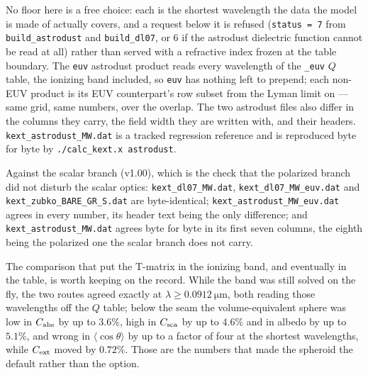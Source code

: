 \documentclass{my_memo}
\begin{document}
\medskip
\noindent No floor here is a free choice: each is the shortest
wavelength the data the model is made of actually covers, and a request
below it is refused (\texttt{status = 7} from \texttt{build\_astrodust}
and \texttt{build\_dl07}, or $6$ if the astrodust dielectric function
cannot be read at all) rather than served with a refractive index
frozen at the table boundary. The \texttt{euv} astrodust product reads
every wavelength of the \texttt{\_euv} $Q$ table, the ionizing band
included, so \texttt{euv} has nothing left to prepend; each non-EUV
product is its EUV counterpart's row subset from the Lyman limit on ---
same grid, same numbers, over the overlap. The two astrodust files also
differ in the columns they carry, the field width they are written
with, and their headers.
\texttt{kext\_astrodust\_MW.dat} is a tracked regression reference and
is reproduced byte for byte by \texttt{./calc\_kext.x astrodust}.

\medskip
\noindent Against the scalar branch (v1.00), which is the check that the
polarized branch did not disturb the scalar optics:
\texttt{kext\_dl07\_MW.dat}, \texttt{kext\_dl07\_MW\_euv.dat} and
\texttt{kext\_zubko\_BARE\_GR\_S.dat} are byte-identical;
\texttt{kext\_astrodust\_MW\_euv.dat} agrees in every number, its
header text being the only difference; and
\texttt{kext\_astrodust\_MW.dat} agrees byte for byte in its first
seven columns, the eighth being the polarized one the scalar branch
does not carry.

\medskip
\noindent The comparison that put the T-matrix in the ionizing band,
and eventually in the table, is worth keeping on the record. While the
band was still solved on the fly, the two routes agreed exactly at
$\lambda\ge\SI{0.0912}{\micro\meter}$, both reading those wavelengths
off the $Q$ table; below the seam the volume-equivalent sphere was low
in $C_{\rm abs}$ by up to $3.6\%$, high in $C_{\rm sca}$ by up to
$4.6\%$ and in albedo by up to $5.1\%$, and wrong in
$\langle\cos\theta\rangle$ by up to a factor of four at the shortest
wavelengths, while $C_{\rm ext}$ moved by $0.72\%$. Those are the
numbers that made the spheroid the default rather than the option.
\end{document}
